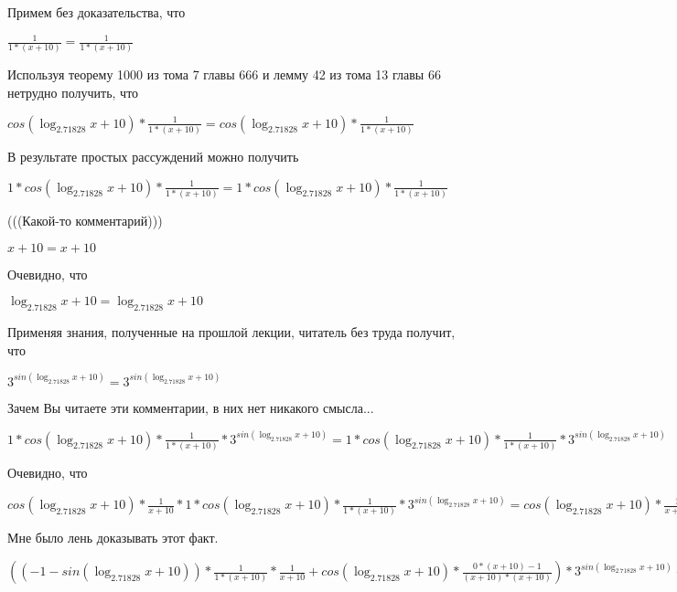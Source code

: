 \documentclass[12pt,a4paper,fleqn]{article}
\theoremstyle{definition}
\begin{document}
Примем без доказательства, что 

$\frac{ 1 }{ 1  * ( x  +  10 )}
 = \frac{ 1 }{ 1  * ( x  +  10 )}
$

Используя теорему 1000 из тома 7 главы 666 и лемму 42 из тома 13 главы 66 нетрудно получить, что 

$cos(\log_{ 2.71828 }{ x  +  10 }) * \frac{ 1 }{ 1  * ( x  +  10 )}
 = cos(\log_{ 2.71828 }{ x  +  10 }) * \frac{ 1 }{ 1  * ( x  +  10 )}
$

В результате простых рассуждений можно получить 

$ 1  * cos(\log_{ 2.71828 }{ x  +  10 }) * \frac{ 1 }{ 1  * ( x  +  10 )}
 =  1  * cos(\log_{ 2.71828 }{ x  +  10 }) * \frac{ 1 }{ 1  * ( x  +  10 )}
$

(((Какой-то комментарий))) 

$ x  +  10  =  x  +  10 $

Очевидно, что 

$\log_{ 2.71828 }{ x  +  10 } = \log_{ 2.71828 }{ x  +  10 }$

Применяя знания, полученные на прошлой лекции, читатель без труда получит, что 

${ 3 }^{sin(\log_{ 2.71828 }{ x  +  10 })} = { 3 }^{sin(\log_{ 2.71828 }{ x  +  10 })}$

Зачем Вы читаете эти комментарии, в них нет никакого смысла... 

$ 1  * cos(\log_{ 2.71828 }{ x  +  10 }) * \frac{ 1 }{ 1  * ( x  +  10 )}
 * { 3 }^{sin(\log_{ 2.71828 }{ x  +  10 })} =  1  * cos(\log_{ 2.71828 }{ x  +  10 }) * \frac{ 1 }{ 1  * ( x  +  10 )}
 * { 3 }^{sin(\log_{ 2.71828 }{ x  +  10 })}$

Очевидно, что 

$cos(\log_{ 2.71828 }{ x  +  10 }) * \frac{ 1 }{ x  +  10 }
 *  1  * cos(\log_{ 2.71828 }{ x  +  10 }) * \frac{ 1 }{ 1  * ( x  +  10 )}
 * { 3 }^{sin(\log_{ 2.71828 }{ x  +  10 })} = cos(\log_{ 2.71828 }{ x  +  10 }) * \frac{ 1 }{ x  +  10 }
 *  1  * cos(\log_{ 2.71828 }{ x  +  10 }) * \frac{ 1 }{ 1  * ( x  +  10 )}
 * { 3 }^{sin(\log_{ 2.71828 }{ x  +  10 })}$

Мне было лень доказывать этот факт.

$(( -1  - sin(\log_{ 2.71828 }{ x  +  10 })) * \frac{ 1 }{ 1  * ( x  +  10 )}
 * \frac{ 1 }{ x  +  10 }
 + cos(\log_{ 2.71828 }{ x  +  10 }) * \frac{ 0  * ( x  +  10 ) -  1 }{( x  +  10 ) * ( x  +  10 )}
) * { 3 }^{sin(\log_{ 2.71828 }{ x  +  10 })} + cos(\log_{ 2.71828 }{ x  +  10 }) * \frac{ 1 }{ x  +  10 }
 *  1  * cos(\log_{ 2.71828 }{ x  +  10 }) * \frac{ 1 }{ 1  * ( x  +  10 )}
 * { 3 }^{sin(\log_{ 2.71828 }{ x  +  10 })} = (( -1  - sin(\log_{ 2.71828 }{ x  +  10 })) * \frac{ 1 }{ 1  * ( x  +  10 )}
 * \frac{ 1 }{ x  +  10 }
 + cos(\log_{ 2.71828 }{ x  +  10 }) * \frac{ 0  * ( x  +  10 ) -  1 }{( x  +  10 ) * ( x  +  10 )}
) * { 3 }^{sin(\log_{ 2.71828 }{ x  +  10 })} + cos(\log_{ 2.71828 }{ x  +  10 }) * \frac{ 1 }{ x  +  10 }
 *  1  * cos(\log_{ 2.71828 }{ x  +  10 }) * \frac{ 1 }{ 1  * ( x  +  10 )}
 * { 3 }^{sin(\log_{ 2.71828 }{ x  +  10 })}$
\end{document}
